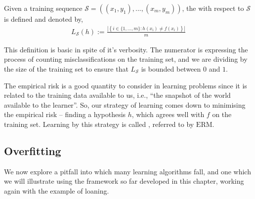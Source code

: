 \begin{definition}
	Given a training sequence $ \mathcal{S} = ( ( x_{1}, y_{1} ), ..., ( x_{m}, y_{m} ) ) $, the  with respect to $ \mathcal{S} $ is defined and denoted by,
	\begin{align*}
		L_{\mathcal{S}}( h ) := \frac{|\left\{ i \in \{ 1,...,m \}: h ( x_{i} ) \neq f ( x_{i} ) \right\}|}{m}
	\end{align*}
\end{definition}

This definition is basic in spite of it's verbosity. The numerator is expressing the process of counting misclassifications on the training set, and we are dividing by the size of the training set to ensure that $ L_{\mathcal{S}} $ is bounded between $ 0 $ and $ 1 $.

The empirical risk is a good quantity to consider in learning problems since it is related to the training data available to us, i.e., ``the snapshot of the world available to the learner''\cite{schwartz}. So, our strategy of learning comes down to minimising the empirical risk -- finding a hypothesis $ h $, which agrees well with $ f $ on the training set. Learning by this strategy is called , referred to by $ \mathrm{ERM} $.

\subsection{Overfitting}
We now explore a pitfall into which many learning algorithms fall, and one which we will illustrate using the framework so far developed in this chapter, working again with the example of loaning.


